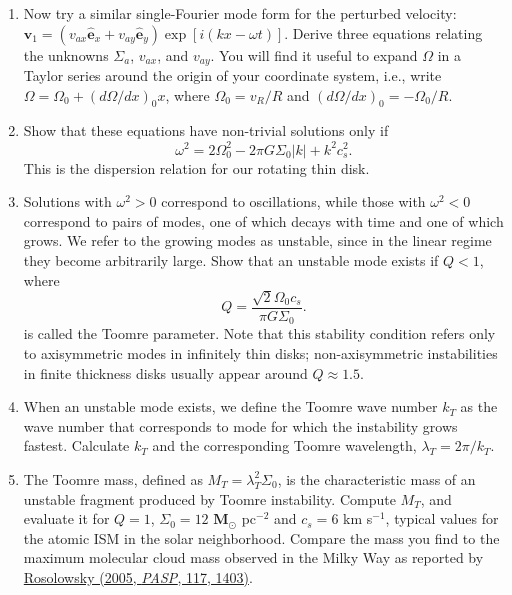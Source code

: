 \documentclass{article}
\newcommand{\vecv}{\mathbf{v}}
\newcommand{\msun}{\ensuremath{\textbf{M}_\odot}}
\newcommand{\ehat}{\hat{\mathbf{e}}}
\begin{document}
\begin{enumerate}
\begin{enumerate}
\item Now try a similar single-Fourier mode form for the perturbed velocity: $\vecv_1 = (v_{ax} \ehat_x + v_{ay} \ehat_y) \exp[i(kx - \omega t)]$. Derive three equations relating the unknowns $\Sigma_a$, $v_{ax}$, and $v_{ay}$. You will find it useful to expand $\Omega$ in a Taylor series around the origin of your coordinate system, i.e., write $\Omega = \Omega_0 + (d\Omega/dx)_0 x$, where $\Omega_0 = v_R/R$ and $(d\Omega/dx)_{0} = -\Omega_0/R$.
\item Show that these equations have non-trivial solutions only if
\begin{displaymath}
\omega^2 = 2 \Omega_0^2 - 2 \pi G \Sigma_0 |k| + k^2 c_s^2.
\end{displaymath}
This is the dispersion relation for our rotating thin disk.
\item Solutions with $\omega^2 > 0$ correspond to oscillations, while those with $\omega^2 < 0$ correspond to pairs of modes, one of which decays with time and one of which grows. We refer to the growing modes as unstable, since in the linear regime they become arbitrarily large. Show that an unstable mode exists if $Q<1$, where
\begin{displaymath}
Q = \frac{\sqrt{2} \Omega_0 c_s}{\pi G \Sigma_0}.
\end{displaymath}
is called the Toomre parameter. Note that this stability condition refers only to axisymmetric modes in infinitely thin disks; non-axisymmetric instabilities in finite thickness disks usually appear around $Q\approx 1.5$.
\item When an unstable mode exists, we define the Toomre wave number $k_T$ as the wave number that corresponds to mode for which the instability grows fastest. Calculate $k_T$ and the corresponding Toomre wavelength, $\lambda_T = 2\pi / k_T$.
\item The Toomre mass, defined as $M_T =  \lambda_T^2 \Sigma_0$, is the characteristic mass of an unstable fragment produced by Toomre instability. Compute $M_T$, and evaluate it for $Q=1$, $\Sigma_0=12$ $\msun$ pc$^{-2}$ and $c_s = 6$ km s$^{-1}$, typical values for the atomic ISM in the solar neighborhood. Compare the mass you find to the maximum molecular cloud mass observed in the Milky Way as reported by \href{http://adsabs.harvard.edu/abs/2005PASP..117.1403R}{Rosolowsky (2005, {\it PASP}, 117, 1403)}. \nocite{rosolowsky05b}\\
\end{enumerate}




\end{enumerate}
\end{document}
